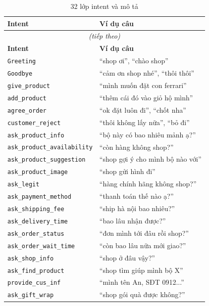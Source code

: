 \documentclass[12pt, a4paper]{report}
\begin{document}
\begin{longtable}{lX}
\caption{32 lớp intent và mô tả} \label{tab:all_intents} \\
\toprule
\textbf{Intent} & \textbf{Ví dụ câu} \\
\midrule
\endfirsthead
\multicolumn{2}{c}{\textit{(tiếp theo)}} \\
\toprule \textbf{Intent} & \textbf{Ví dụ câu} \\ \midrule
\endhead
\bottomrule \endlastfoot
\texttt{Greeting}                    & ``shop ơi'', ``chào shop'' \\
\texttt{Goodbye}                     & ``cảm ơn shop nhé'', ``thôi thôi'' \\
\texttt{give\_product}               & ``mình muốn đặt con ferrari'' \\
\texttt{add\_product}                & ``thêm cái đó vào giỏ hộ mình'' \\
\texttt{agree\_order}                & ``ok đặt luôn đi'', ``chốt nha'' \\
\texttt{customer\_reject}            & ``thôi không lấy nữa'', ``bỏ đi'' \\
\texttt{ask\_product\_info}          & ``bộ này có bao nhiêu mảnh ạ?'' \\
\texttt{ask\_product\_availability}  & ``còn hàng không shop?'' \\
\texttt{ask\_product\_suggestion}    & ``shop gợi ý cho mình bộ nào với'' \\
\texttt{ask\_product\_image}         & ``shop gửi hình đi'' \\
\texttt{ask\_legit}                  & ``hàng chính hãng không shop?'' \\
\texttt{ask\_payment\_method}        & ``thanh toán thế nào ạ?'' \\
\texttt{ask\_shipping\_fee}          & ``ship hà nội bao nhiêu?'' \\
\texttt{ask\_delivery\_time}         & ``bao lâu nhận được?'' \\
\texttt{ask\_order\_status}          & ``đơn mình tới đâu rồi shop?'' \\
\texttt{ask\_order\_wait\_time}      & ``còn bao lâu nữa mới giao?'' \\
\texttt{ask\_shop\_info}             & ``shop ở đâu vậy?'' \\
\texttt{ask\_find\_product}          & ``shop tìm giúp mình bộ X'' \\
\texttt{provide\_cus\_inf}           & ``mình tên An, SĐT 0912...'' \\
\texttt{ask\_gift\_wrap}             & ``shop gói quà được không?'' \\

\end{longtable}
\end{document}
